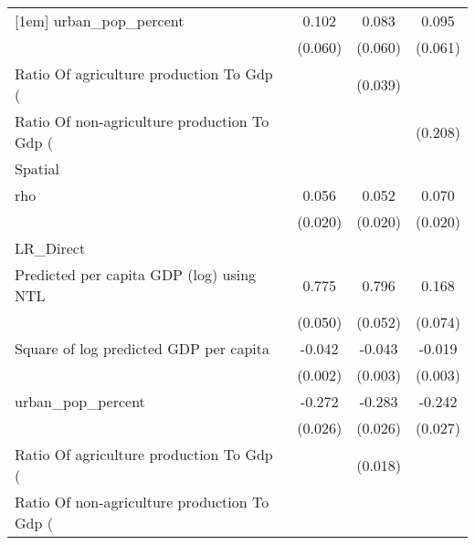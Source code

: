 {\begin{tabular}{l*{3}{c}}
[1em]
urban\_pop\_percent   &       0.102\sym{*}  &       0.083         &       0.095         \\
                    &     (0.060)         &     (0.060)         &     (0.061)         \\
[1em]
Ratio Of agriculture production To Gdp (%
                    &                     &     (0.039)         &                     \\
[1em]
Ratio Of non-agriculture production To Gdp (%
                    &                     &                     &     (0.208)         \\
\hline
Spatial             &                     &                     &                     \\
rho                 &       0.056\sym{***}&       0.052\sym{***}&       0.070\sym{***}\\
                    &     (0.020)         &     (0.020)         &     (0.020)         \\
\hline
LR\_Direct           &                     &                     &                     \\
Predicted per capita GDP (log) using NTL&       0.775\sym{***}&       0.796\sym{***}&       0.168\sym{**} \\
                    &     (0.050)         &     (0.052)         &     (0.074)         \\
[1em]
Square of log predicted GDP per capita&      -0.042\sym{***}&      -0.043\sym{***}&      -0.019\sym{***}\\
                    &     (0.002)         &     (0.003)         &     (0.003)         \\
[1em]
urban\_pop\_percent   &      -0.272\sym{***}&      -0.283\sym{***}&      -0.242\sym{***}\\
                    &     (0.026)         &     (0.026)         &     (0.027)         \\
[1em]
Ratio Of agriculture production To Gdp (%
                    &                     &     (0.018)         &                     \\
[1em]
Ratio Of non-agriculture production To Gdp (%

\end{tabular}}

